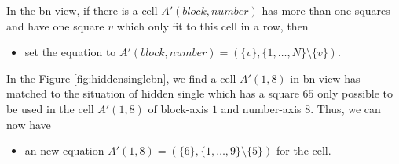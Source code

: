\documentclass[11pt]{report}
\newcommand{\set}[1]{\{ #1 \}}
\begin{document}
In the bn-view, if there is a cell $A'(block, number)$ has more than one squares and have one square $v$ which only fit to this cell in a row, then
\begin{itemize}
\item set the equation to $A'(block, number) =(\set{v}, \set{1,\dots,N} \setminus \set{v})$.
\end{itemize}
In the Figure \ref{fig:hiddensinglebn}, we find a cell $A'(1, 8)$ in bn-view has matched to the situation of hidden single which has a square $65$ only possible to be used in the cell $A'(1, 8)$ of block-axis $1$ and number-axis $8$. Thus, we can now have 
\begin{itemize}
\item an new equation $A'(1, 8) =(\set{6}, \set{1,\dots,9} \setminus \set{5})$ for the cell.
\end{itemize}
\end{document}
